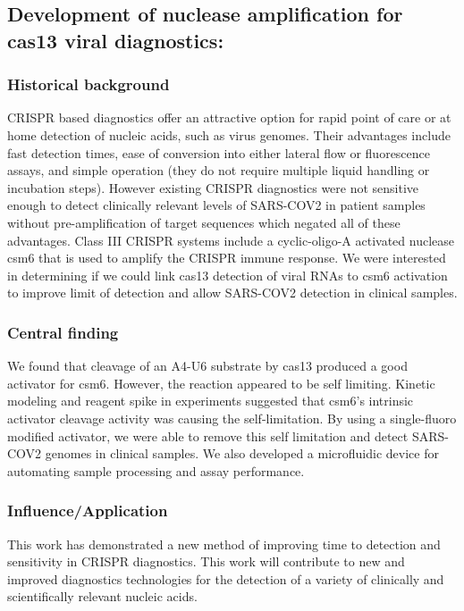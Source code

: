 \documentclass{article}
\begin{document}
\leavevmode\newline

\newrefsection
\subsection{Development of nuclease amplification for cas13 viral diagnostics:}
\subsubsection{Historical background}
CRISPR based diagnostics offer an attractive option for rapid point of care or at home detection of nucleic acids, such as virus genomes.
Their advantages include fast detection times, ease of conversion into either lateral flow or fluorescence assays, and simple operation (they do not require multiple liquid handling or incubation steps).
However existing CRISPR diagnostics were not sensitive enough to detect clinically relevant levels of SARS-COV2 in patient samples without pre-amplification of target sequences which negated all of these advantages.
Class III CRISPR systems include a cyclic-oligo-A activated nuclease csm6 that is used to amplify the CRISPR immune response.
We were interested in determining if we could link cas13 detection of viral RNAs to csm6 activation to improve limit of detection and allow SARS-COV2 detection in clinical samples.
%
\subsubsection{Central finding}
We found that cleavage of an A4-U6 substrate by cas13 produced a good activator for csm6.
However, the reaction appeared to be self limiting.
Kinetic modeling and reagent spike in experiments suggested that csm6's intrinsic activator cleavage activity was causing the self-limitation.
By using a single-fluoro modified activator, we were able to remove this self limitation and detect SARS-COV2 genomes in clinical samples.
We also developed a microfluidic device for automating sample processing and assay performance.
%
\subsubsection{Influence/Application}
This work has demonstrated a new method of improving time to detection and sensitivity in CRISPR diagnostics. 
This work will contribute to new and improved diagnostics technologies for the detection of a variety of clinically and scientifically relevant nucleic acids.
%
\end{document}
